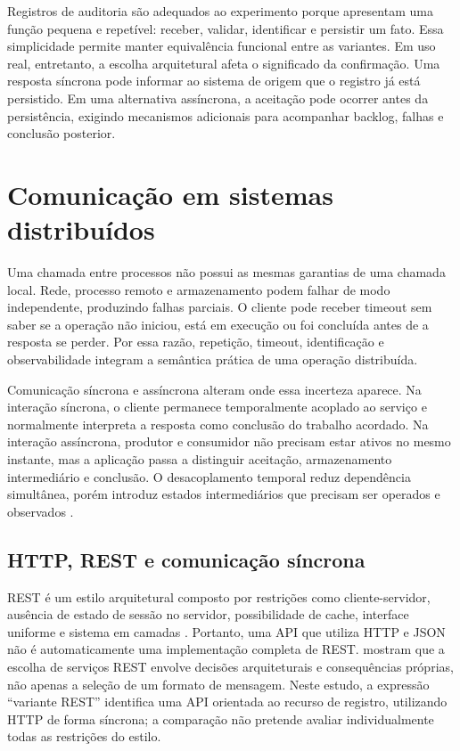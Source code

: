 Registros de auditoria são adequados ao experimento porque apresentam uma função pequena e repetível: receber, validar, identificar e persistir um fato. Essa simplicidade permite manter equivalência funcional entre as variantes. Em uso real, entretanto, a escolha arquitetural afeta o significado da confirmação. Uma resposta síncrona pode informar ao sistema de origem que o registro já está persistido. Em uma alternativa assíncrona, a aceitação pode ocorrer antes da persistência, exigindo mecanismos adicionais para acompanhar backlog, falhas e conclusão posterior.

\section{Comunicação em sistemas distribuídos}

Uma chamada entre processos não possui as mesmas garantias de uma chamada local. Rede, processo remoto e armazenamento podem falhar de modo independente, produzindo falhas parciais. O cliente pode receber timeout sem saber se a operação não iniciou, está em execução ou foi concluída antes de a resposta se perder. Por essa razão, repetição, timeout, identificação e observabilidade integram a semântica prática de uma operação distribuída.

Comunicação síncrona e assíncrona alteram onde essa incerteza aparece. Na interação síncrona, o cliente permanece temporalmente acoplado ao serviço e normalmente interpreta a resposta como conclusão do trabalho acordado. Na interação assíncrona, produtor e consumidor não precisam estar ativos no mesmo instante, mas a aplicação passa a distinguir aceitação, armazenamento intermediário e conclusão. O desacoplamento temporal reduz dependência simultânea, porém introduz estados intermediários que precisam ser operados e observados \cite{aksakalli2021,helland2007}.

\subsection{HTTP, REST e comunicação síncrona}

REST é um estilo arquitetural composto por restrições como cliente-servidor, ausência de estado de sessão no servidor, possibilidade de cache, interface uniforme e sistema em camadas \cite{fielding2002}. Portanto, uma API que utiliza HTTP e JSON não é automaticamente uma implementação completa de REST.  mostram que a escolha de serviços REST envolve decisões arquiteturais e consequências próprias, não apenas a seleção de um formato de mensagem. Neste estudo, a expressão ``variante REST'' identifica uma API orientada ao recurso de registro, utilizando HTTP de forma síncrona; a comparação não pretende avaliar individualmente todas as restrições do estilo.

